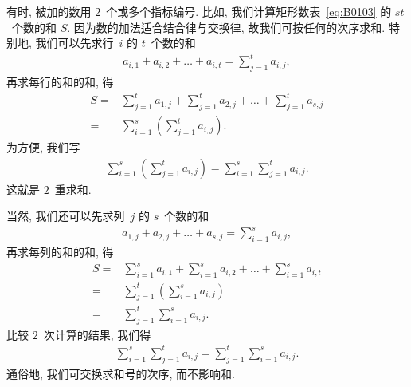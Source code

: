 \documentclass[../libro.tex]{subfiles}
\begin{document}
有时, 被加的数用 \(2\)~个或多个指标编号.
比如, 我们计算矩形数表~\eqref{eq:B0103} 的 \(st\)~个数的和 \(S\).
因为数的加法适合结合律与交换律,
故我们可按任何的次序求和.
特别地, 我们可以先求行~\(i\) 的 \(t\)~个数的和
\begin{align*}
    a_{i,1} + a_{i,2} + \dots + a_{i,t}
    = \sum_{j = 1}^{t} {a_{i,j}},
\end{align*}
再求每行的和的和, 得
\begin{align*}
    S
    = {} &
    \sum_{j = 1}^{t} {a_{1,j}}
    + \sum_{j = 1}^{t} {a_{2,j}}
    + \dots
    + \sum_{j = 1}^{t} {a_{s,j}}
    \\
    = {} &
    \sum_{i = 1}^{s}
    {\left( \sum_{j = 1}^{t} a_{i,j} \right)}.
\end{align*}
为方便, 我们写
\begin{align*}
    \sum_{i = 1}^{s}
    {\left( \sum_{j = 1}^{t} a_{i,j} \right)}
    = \sum_{i = 1}^{s}
    {\sum_{j = 1}^{t} {a_{i,j}}}.
\end{align*}
这就是 \(2\)~重求和.

当然, 我们还可以先求列~\(j\) 的 \(s\)~个数的和
\begin{align*}
    a_{1,j} + a_{2,j} + \dots + a_{s,j}
    = \sum_{i = 1}^{s} {a_{i,j}},
\end{align*}
再求每列的和的和, 得
\begin{align*}
    S
    = {} &
    \sum_{i = 1}^{s} {a_{i,1}}
    + \sum_{i = 1}^{s} {a_{i,2}}
    + \dots
    + \sum_{i = 1}^{s} {a_{i,t}}
    \\
    = {} &
    \sum_{j = 1}^{t}
    {\left( \sum_{i = 1}^{s} {a_{i,j}} \right)}
    \\
    = {} &
    \sum_{j = 1}^{t} {
    \sum_{i = 1}^{s} {a_{i,j}}}.
\end{align*}
比较 \(2\)~次计算的结果, 我们得
\begin{align*}
    \sum_{i = 1}^{s} {\sum_{j = 1}^{t} {a_{i,j}}}
    = \sum_{j = 1}^{t} {\sum_{i = 1}^{s} {a_{i,j}}}.
\end{align*}
通俗地, 我们可交换求和号的次序, 而不影响和.
\end{document}
